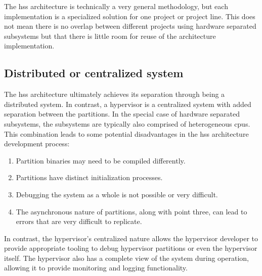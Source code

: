 The \acrshort{hss} architecture is technically a very general methodology, but each implementation is a specialized solution for one project or project line. This does not mean there is no overlap between different projects using hardware separated subsystems but that there is little room for reuse of the architecture implementation.


\subsection{Distributed or centralized system} \label{distributed-or-centralized}
The \acrshort{hss} architecture ultimately achieves its separation through being a distributed system. In contrast, a hypervisor is a centralized system with added separation between the partitions. In the special case of hardware separated subsystems, the subsystems are typically also comprised of heterogeneous \acrshort{cpu}s. This combination leads to some potential disadvantages in the \gls{hss} architecture development process:
\begin{enumerate}
\item Partition binaries may need to be compiled differently.
\item Partitions have distinct initialization processes.
\item Debugging the system as a whole is not possible or very difficult.
\item The asynchronous nature of partitions, along with point three, can lead to errors that are very difficult to replicate.
\end{enumerate}
In contrast, the hypervisor's centralized nature allows the hypervisor developer to provide appropriate tooling to debug hypervisor partitions or even the hypervisor itself. The hypervisor also has a complete view of the system during operation, allowing it to provide monitoring and logging functionality.
